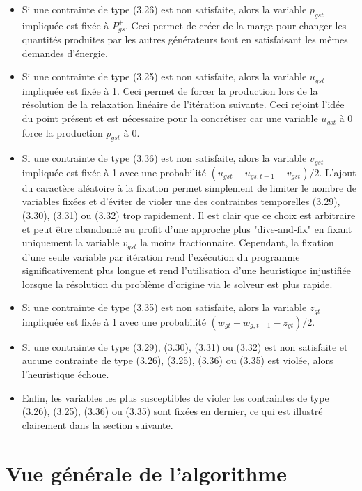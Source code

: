 \begin{itemize}
    \item Si une contrainte de type (3.26) est non satisfaite, alors la variable $p_{gst}$
    impliquée est fixée à $P_{gs}^{+}$. Ceci permet de créer de la marge pour changer les
    quantités produites par les autres générateurs tout en satisfaisant les mêmes
    demandes d'énergie.
    \item Si une contrainte de type (3.25) est non satisfaite, alors la variable $u_{gst}$
    impliquée est fixée à 1. Ceci permet de forcer la production lors de la résolution
    de la relaxation linéaire de l'itération suivante. Ceci rejoint l'idée du point présent
    et est nécessaire pour la concrétiser car une variable $u_{gst}$ à 0 force la production
    $p_{gst}$ à 0.
    \item Si une contrainte de type (3.36) est non satisfaite, alors la variable $v_{gst}$
    impliquée est fixée à 1 avec une probabilité $(u_{gst} - u_{gs,t-1} - v_{gst}) / 2$.
    L'ajout du caractère aléatoire à la fixation permet simplement de limiter le nombre de
    variables fixées et d'éviter de violer une des contraintes temporelles
    (3.29), (3.30), (3.31) ou (3.32) trop rapidement. Il est clair que ce choix est arbitraire
    et peut être abandonné au profit d'une approche plus "dive-and-fix" en fixant uniquement
    la variable $v_{gst}$ la moins fractionnaire. Cependant, la fixation d'une seule variable
    par itération rend l'exécution du programme significativement plus longue et rend l'utilisation
    d'une heuristique injustifiée lorsque la résolution du problème d'origine via le solveur
    est plus rapide.
    \item Si une contrainte de type (3.35) est non satisfaite, alors la variable $z_{gt}$
    impliquée est fixée à 1 avec une probabilité $(w_{gt} - w_{g,t-1} - z_{gt}) / 2$.
    \item Si une contrainte de type (3.29), (3.30), (3.31) ou (3.32) est non satisfaite et
    aucune contrainte de type (3.26), (3.25), (3.36) ou (3.35) est violée, alors l'heuristique
    échoue.
    \item Enfin, les variables les plus susceptibles de violer les contraintes de type
    (3.26), (3.25), (3.36) ou (3.35) sont fixées en dernier, ce qui est illustré
    clairement dans la section suivante.
\end{itemize}

\section{Vue générale de l'algorithme}

